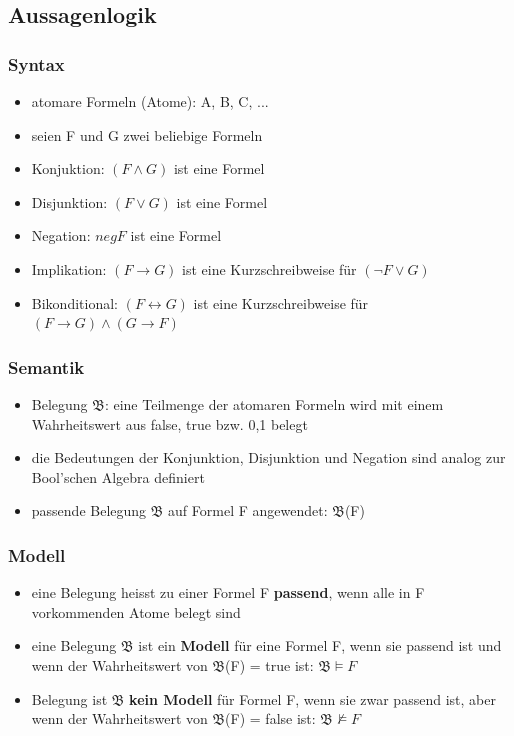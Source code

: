 \documentclass[a4paper,10pt]{article}
\newcommand{\Bold}[1]{\textbf{#1}} %
\newcommand{\lra}{\leftrightarrow} %
\begin{document}
\subsection{Aussagenlogik}
\subsubsection{Syntax}
\begin{itemize}
\item atomare Formeln (Atome): A, B, C, ...
\item seien F und G zwei beliebige Formeln
\item Konjuktion: $(F\wedge G)$ ist eine Formel
\item Disjunktion: $(F\vee G)$ ist eine Formel
\item Negation: $neg F$ ist eine Formel
\item Implikation: $(F\to G)$ ist eine Kurzschreibweise f\"ur $(\neg F\vee G)$
\item Bikonditional: $(F\lra G)$ ist eine Kurzschreibweise f\"ur $(F\to G)\wedge(G\to F)$
\end{itemize}
\subsubsection{Semantik}
		\begin{itemize}
				\item Belegung $\mathfrak{B}$: eine Teilmenge der atomaren Formeln wird mit einem Wahrheitswert aus {false, true} bzw. {0,1} belegt
				\item die Bedeutungen der Konjunktion, Disjunktion und Negation sind analog zur Bool'schen Algebra definiert
				\item passende Belegung $\mathfrak{B}$ auf Formel F angewendet: $\mathfrak{B}$(F)
		\end{itemize}
		
\subsubsection{Modell}
		\begin{itemize}
			\item eine Belegung heisst zu einer Formel F \Bold {passend}, wenn alle in F
vorkommenden Atome belegt sind
			\item eine Belegung $\mathfrak{B}$ ist ein \Bold {Modell} f\"ur eine Formel F, wenn sie passend ist
und wenn der Wahrheitswert von $\mathfrak{B}$(F) = true ist: $\mathfrak{B} \models F$
			\item Belegung ist $\mathfrak{B}$ \Bold {kein Modell} f\"ur Formel F, wenn sie zwar passend ist,
aber wenn der Wahrheitswert von $\mathfrak{B}$(F) = false ist: $\mathfrak{B} \nvDash F$
		\end{itemize}
		
\end{document}
